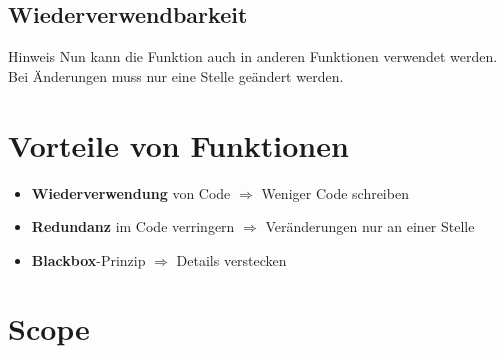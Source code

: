 \subsection{Wiederverwendbarkeit}
\begin{frame}
    \slidehead
    \vspace{-1ex}
    \vspace{-1ex}
    \begin{block}{Hinweis}
        Nun kann die Funktion auch in anderen Funktionen verwendet werden.
        Bei Änderungen muss nur eine Stelle geändert werden.
    \end{block}
\end{frame}

\section{Vorteile von Funktionen}
\begin{frame}[<+(1)->]
    \slidehead

    \begin{itemize}
        \item \textbf{Wiederverwendung} von Code $\Rightarrow$ Weniger Code schreiben
        \item \textbf{Redundanz} im Code verringern $\Rightarrow$ Veränderungen nur an einer Stelle
        \item \textbf{Blackbox}-Prinzip $\Rightarrow$ Details verstecken
    \end{itemize}
\end{frame}

\livecoding

\subtitle{Kapitel 6: wie Funktionen funktionieren}

\section{Scope}
